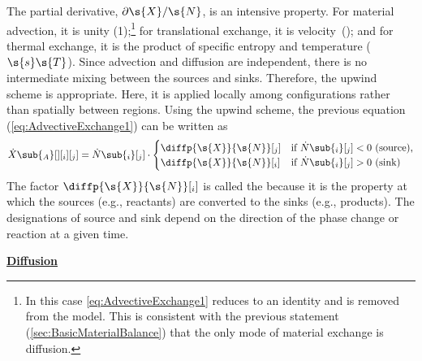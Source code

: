 The partial derivative, $\partial\s{X}/\s{N}$, is an intensive property.  For material advection, it is unity (1);\footnote{\label{fn:NoAdvectiveMaterialExchange}In this case \autoref{eq:AdvectiveExchange1} reduces to an identity and is removed from the model.  This is consistent with the previous statement (\autoref{sec:BasicMaterialBalance}) that the only mode of material exchange is diffusion.} for translational exchange, it is velocity~(); and for thermal exchange, it is the product of specific entropy and temperature ($\s{s}\s{T}$).  Since advection and diffusion are independent, there is no intermediate mixing between the sources and sinks.  Therefore, the upwind scheme is appropriate.  Here, it is applied locally among configurations rather than spatially between regions.  Using the upwind scheme, the previous equation (\ref{eq:AdvectiveExchange1}) can be written as
\begin{equation}
  \label{eq:AdvectiveExchange2}
  \dot{X}\sub{_A}[ ][_i][_j] = \dot{N}\sub{_i}[_j]\cdot
  \begin{cases}%
    \diffp{\s{X}}{\s{N}}[_j] & \text{if $\dot{N}\sub{_i}[_j] < 0$ (source),} \\
    \diffp{\s{X}}{\s{N}}[_i] & \text{if $\dot{N}\sub{_i}[_j] > 0$ (sink)}
  \end{cases}
\end{equation}
The factor $\diffp{\s{X}}{\s{N}}[_i]$ is called the \emph{} because it is the property at which the sources (e.g., reactants) are converted to the sinks (e.g., products).  The designations of source and sink depend on the direction of the phase change or reaction at a given time.



\noindent\underline{\textbf{Diffusion}}

